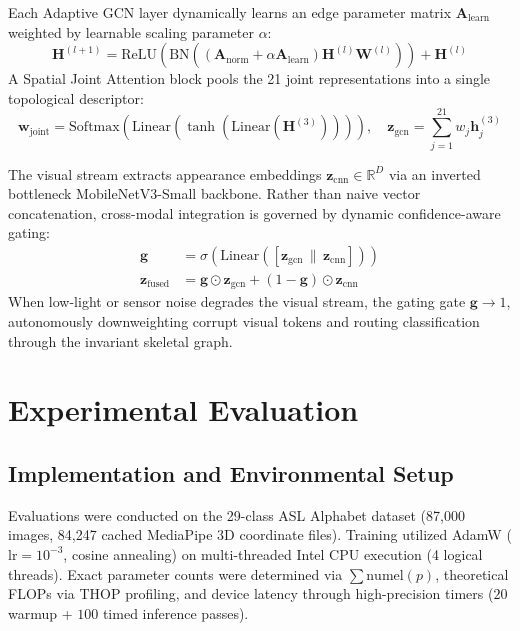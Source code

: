 \documentclass[journal]{IEEEtran}
\begin{document}
Each Adaptive GCN layer dynamically learns an edge parameter matrix $\mathbf{A}_{\text{learn}}$ weighted by learnable scaling parameter $\alpha$:
\begin{equation}
    \mathbf{H}^{(l+1)} = \text{ReLU}\left(\text{BN}\left((\mathbf{A}_{\text{norm}} + \alpha \mathbf{A}_{\text{learn}}) \mathbf{H}^{(l)} \mathbf{W}^{(l)}\right)\right) + \mathbf{H}^{(l)}
\end{equation}
A Spatial Joint Attention block pools the 21 joint representations into a single topological descriptor:
\begin{equation}
    \mathbf{w}_{\text{joint}} = \text{Softmax}(\text{Linear}(\tanh(\text{Linear}(\mathbf{H}^{(3)})))), \quad \mathbf{z}_{\text{gcn}} = \sum_{j=1}^{21} w_j \mathbf{h}_j^{(3)}
\end{equation}

The visual stream extracts appearance embeddings $\mathbf{z}_{\text{cnn}} \in \mathbb{R}^{D}$ via an inverted bottleneck MobileNetV3-Small backbone. Rather than naive vector concatenation, cross-modal integration is governed by dynamic confidence-aware gating:
\begin{align}
    \mathbf{g} &= \sigma\left(\text{Linear}([\mathbf{z}_{\text{gcn}} \,\|\, \mathbf{z}_{\text{cnn}}])\right) \\
    \mathbf{z}_{\text{fused}} &= \mathbf{g} \odot \mathbf{z}_{\text{gcn}} + (1 - \mathbf{g}) \odot \mathbf{z}_{\text{cnn}}
\end{align}
When low-light or sensor noise degrades the visual stream, the gating gate $\mathbf{g} \to 1$, autonomously downweighting corrupt visual tokens and routing classification through the invariant skeletal graph.

\section{Experimental Evaluation}

\subsection{Implementation and Environmental Setup}
Evaluations were conducted on the 29-class ASL Alphabet dataset (87,000 images, 84,247 cached MediaPipe 3D coordinate files). Training utilized AdamW ($\text{lr}=10^{-3}$, cosine annealing) on multi-threaded Intel CPU execution (4 logical threads). Exact parameter counts were determined via $\sum \text{numel}(p)$, theoretical FLOPs via THOP profiling, and device latency through high-precision timers ($20$ warmup + $100$ timed inference passes).
\end{document}

